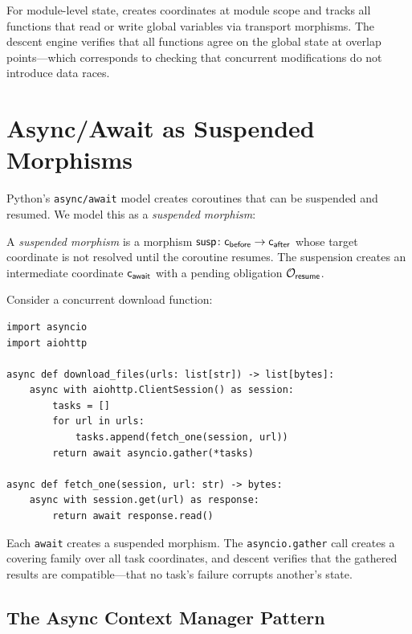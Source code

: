 \documentclass[11pt]{article}
\newcommand{\susp}{\mathsf{susp}}        %
\begin{document}
For module-level state, \JuGeo{} creates coordinates at module scope
and tracks all functions that read or write global variables via
transport morphisms.  The descent engine verifies that all functions
agree on the global state at overlap points---which corresponds to
checking that concurrent modifications do not introduce data races.

\section{Async/Await as Suspended Morphisms}\label{sec:async}

Python's \texttt{async/await} model creates coroutines that can be
suspended and resumed.  We model this as a \emph{suspended morphism}:

\begin{definition}\label{def:suspended}
A \emph{suspended morphism} is a morphism
$\susp \colon \coord_{\mathsf{before}} \to \coord_{\mathsf{after}}$
whose target coordinate is not resolved until the coroutine resumes.
The suspension creates an intermediate coordinate
$\mathsf{c}_{\mathsf{await}}$ with a pending obligation
$\mathcal{O}_{\mathsf{resume}}$.
\end{definition}

Consider a concurrent download function:

\begin{lstlisting}[style=jugeo-python,caption={Async file download.}]
import asyncio
import aiohttp

async def download_files(urls: list[str]) -> list[bytes]:
    async with aiohttp.ClientSession() as session:
        tasks = []
        for url in urls:
            tasks.append(fetch_one(session, url))
        return await asyncio.gather(*tasks)

async def fetch_one(session, url: str) -> bytes:
    async with session.get(url) as response:
        return await response.read()
\end{lstlisting}

Each \texttt{await} creates a suspended morphism.  The
\texttt{asyncio.gather} call creates a covering family over all
task coordinates, and descent verifies that the gathered results
are compatible---\ie that no task's failure corrupts another's state.

\subsection{The Async Context Manager Pattern}
\end{document}
